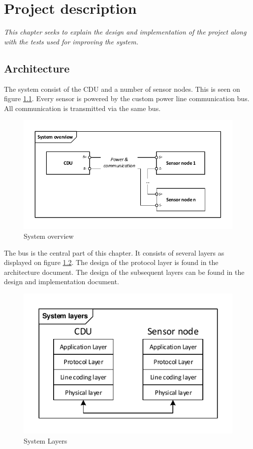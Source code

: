 \chapter{Project description}
\textit{This chapter seeks to explain the design and implementation of the project along with the tests used for improving the system.}
\section{Architecture}
The system consist of the CDU and a number of sensor nodes. This is seen on figure \ref{fig:systembdd}. Every sensor is powered by the custom power line communication bus. All communication is transmitted via the same bus. 
\begin{figure}[H]
	\centering
	\includegraphics[width=.9\textwidth]{billeder/11ProjectDescription/systembdd}
	\caption{System overview}
	\label{fig:systembdd}
\end{figure}
The bus is the central part of this chapter. It consists of several layers as displayed on figure \ref{fig:systemlayers}. The design of the protocol layer is found in the architecture document. The design of the subsequent layers can be found in the design and implementation document.
\begin{figure}[H]
	\centering
	\includegraphics[width=.6\textwidth]{billeder/11ProjectDescription/System_Layers}
	\caption{System Layers}
	\label{fig:systemlayers}
\end{figure}
